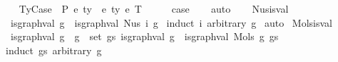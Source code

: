 \begin{isabellebody}
\isamarkupfalse%
\isanewline
\ \ \isamarkupfalse%
\ {\isacharparenleft}{\kern0pt}TyCase\ {\isasymGamma}\ P\ e{}\ ty{}\ {\isasymGamma}{}\ e{}\ ty{}\ e{}\ T{\isacharparenright}{\kern0pt}\isanewline
\ \ \isamarkupfalse%
\ \isamarkupfalse%
\ {\isacharquery}{\kern0pt}case\isanewline
\ \ \isamarkupfalse%
\ auto\isanewline
\ \ \isamarkupfalse%
\isanewline
{}\isamarkupfalse%
%
\endisatagproof
{\isafoldproof}%
%
\isadelimproof
%
\endisadelimproof
%
\isadelimdocument
%
\endisadelimdocument
%
\isatagdocument
%
\isamarkuptrue%
%
\endisatagdocument
{\isafolddocument}%
%
\isadelimdocument
%
\endisadelimdocument
{}\isamarkupfalse%
\ Nus{\isacharunderscore}{\kern0pt}is{\isacharunderscore}{\kern0pt}val{\isacharcolon}{\kern0pt}\isanewline
\ \ {\isachardoublequoteopen}is{\isacharunderscore}{\kern0pt}graph{\isacharunderscore}{\kern0pt}val\ g\ {\isacharequal}{\kern0pt}\ is{\isacharunderscore}{\kern0pt}graph{\isacharunderscore}{\kern0pt}val\ {\isacharparenleft}{\kern0pt}Nus{}\ i\ g{\isacharparenright}{\kern0pt}{\isachardoublequoteclose}\isanewline
%
\isadelimproof
%
\endisadelimproof
%
\isatagproof
{}\isamarkupfalse%
\ {\isacharparenleft}{\kern0pt}induct\ i\ arbitrary{\isacharcolon}{\kern0pt}\ g{\isacharparenright}{\kern0pt}\isanewline
{}\isamarkupfalse%
\ auto%
\endisatagproof
{\isafoldproof}%
%
\isadelimproof
\isanewline
%
\endisadelimproof
\isanewline
\isanewline
{}\isamarkupfalse%
\ Mols{}{\isacharunderscore}{\kern0pt}is{\isacharunderscore}{\kern0pt}val{\isacharcolon}{\kern0pt}\isanewline
\ \ {\isachardoublequoteopen}{\isacharparenleft}{\kern0pt}is{\isacharunderscore}{\kern0pt}graph{\isacharunderscore}{\kern0pt}val\ g\ {\isasymand}\ {\isacharparenleft}{\kern0pt}{\isasymforall}g\ {\isasymin}\ set\ gs{\isachardot}{\kern0pt}\ is{\isacharunderscore}{\kern0pt}graph{\isacharunderscore}{\kern0pt}val\ g{\isacharparenright}{\kern0pt}{\isacharparenright}{\kern0pt}\ {\isacharequal}{\kern0pt}\ is{\isacharunderscore}{\kern0pt}graph{\isacharunderscore}{\kern0pt}val\ {\isacharparenleft}{\kern0pt}Mols{}\ g\ gs{\isacharparenright}{\kern0pt}{\isachardoublequoteclose}\isanewline
%
\isadelimproof
%
\endisadelimproof
%
\isatagproof
{}\isamarkupfalse%
\ {\isacharparenleft}{\kern0pt}induct\ gs\ arbitrary{\isacharcolon}{\kern0pt}\ g{\isacharparenright}{\kern0pt}\isanewline

\end{isabellebody}
